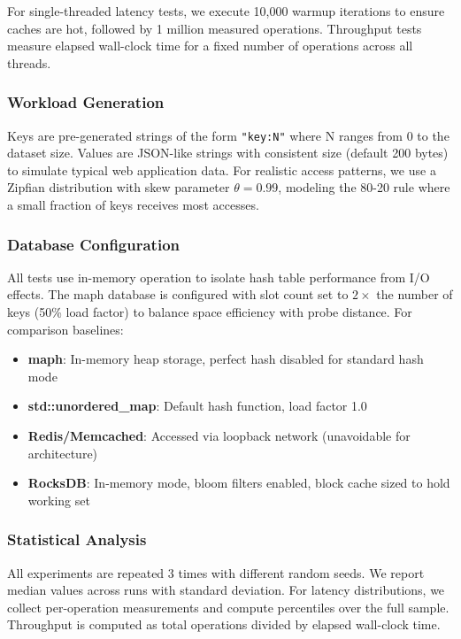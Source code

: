 \documentclass[10pt,conference]{IEEEtran}
\begin{document}
For single-threaded latency tests, we execute 10,000 warmup iterations to ensure caches are hot, followed by 1 million measured operations. Throughput tests measure elapsed wall-clock time for a fixed number of operations across all threads.

\subsubsection{Workload Generation}
Keys are pre-generated strings of the form \texttt{"key:N"} where N ranges from 0 to the dataset size. Values are JSON-like strings with consistent size (default 200 bytes) to simulate typical web application data. For realistic access patterns, we use a Zipfian distribution with skew parameter $\theta = 0.99$, modeling the 80-20 rule where a small fraction of keys receives most accesses.

\subsubsection{Database Configuration}
All tests use in-memory operation to isolate hash table performance from I/O effects. The maph database is configured with slot count set to $2 \times$ the number of keys (50\% load factor) to balance space efficiency with probe distance. For comparison baselines:

\begin{itemize}
\item \textbf{maph}: In-memory heap storage, perfect hash disabled for standard hash mode
\item \textbf{std::unordered\_map}: Default hash function, load factor 1.0
\item \textbf{Redis/Memcached}: Accessed via loopback network (unavoidable for architecture)
\item \textbf{RocksDB}: In-memory mode, bloom filters enabled, block cache sized to hold working set
\end{itemize}

\subsubsection{Statistical Analysis}
All experiments are repeated 3 times with different random seeds. We report median values across runs with standard deviation. For latency distributions, we collect per-operation measurements and compute percentiles over the full sample. Throughput is computed as total operations divided by elapsed wall-clock time.
\end{document}
